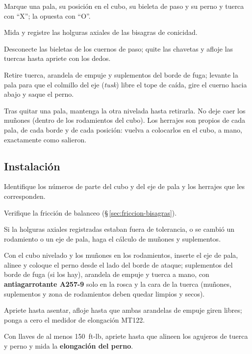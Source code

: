 \begin{pasos}
\item Marque una pala, su posición en el cubo, su bieleta de paso y su perno y tuerca con ``X''; la opuesta con ``O''.
\item Mida y registre las holguras axiales de las bisagras de conicidad.
\item Desconecte las bieletas de los cuernos de paso; quite las chavetas y afloje las tuercas hasta apriete con los dedos.
\item Retire tuerca, arandela de empuje y suplementos del borde de fuga; levante la pala para que el colmillo del eje (\emph{tusk}) libre el tope de caída, gire el cuerno hacia abajo y saque el perno.
\end{pasos}

\begin{precaucion}
Tras quitar una pala, mantenga la otra nivelada hasta retirarla. No deje caer los muñones (dentro de los rodamientos del cubo). Los herrajes son propios de cada pala, de cada borde y de cada posición: vuelva a colocarlos en el cubo, a mano, exactamente como salieron.
\end{precaucion}

\subsection{Instalación}

\begin{pasos}
\item Identifique los números de parte del cubo y del eje de pala y los herrajes que les corresponden.
\item Verifique la fricción de balanceo (\S\,\ref{sec:friccion-bisagras}).
\item Si la holguras axiales registradas estaban fuera de tolerancia, o se cambió un rodamiento o un eje de pala, haga el cálculo de muñones y suplementos.
\item Con el cubo nivelado y los muñones en los rodamientos, inserte el eje de pala, alinee y coloque el perno desde el lado del borde de ataque; suplementos del borde de fuga (si los hay), arandela de empuje y tuerca a mano, con \textbf{antiagarrotante A257-9} solo en la rosca y la cara de la tuerca (muñones, suplementos y zona de rodamientos deben quedar limpios y secos).
\item Apriete hasta asentar, afloje hasta que ambas arandelas de empuje giren libres; ponga a cero el medidor de elongación MT122.
\item Con llaves de al menos 150~ft-lb, apriete hasta que alineen los agujeros de tuerca y perno y mida la \textbf{elongación del perno}.
\end{pasos}

